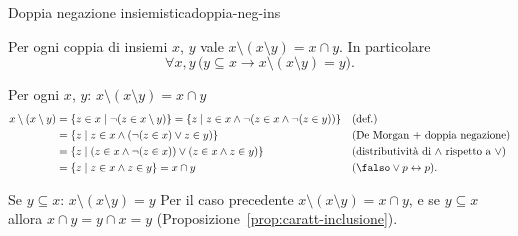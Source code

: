 \begin{concetto}
\begin{Proposizione}{Doppia negazione insiemistica}{doppia-neg-ins}
    \begin{prerequisiti}
    \end{prerequisiti}
    Per ogni coppia di insiemi $x$, $y$ vale $x \setminus (x \setminus y) = x \cap y$. In particolare
    \[ \forall x, y\,\big(y \subseteq x \rightarrow x \setminus (x \setminus y) = y\big). \]
\end{Proposizione}
\begin{dimostrazione}
    \begin{caso}{Per ogni $x$, $y$: $x \setminus (x \setminus y) = x \cap y$}
    \[
    \begin{aligned}
        x \setminus (x \setminus y) &= \{z \in x \mid \neg(z \in x \setminus y)\} = \{z \mid z \in x \wedge \neg(z \in x \wedge \neg(z \in y))\} && \text{(def.)}\\
        &= \{z \mid z \in x \wedge (\neg(z \in x) \vee z \in y)\} && \text{(De Morgan + doppia negazione)}\\
        &= \{z \mid (z \in x \wedge \neg(z \in x)) \vee (z \in x \wedge z \in y)\} && \text{(distributività di $\wedge$ rispetto a $\vee$)}\\
        &= \{z \mid z \in x \wedge z \in y\} = x \cap y && \text{($\falso \vee p \leftrightarrow p$)}.
    \end{aligned}
    \]
    \end{caso}
    \begin{caso}{Se $y \subseteq x$: $x \setminus (x \setminus y) = y$}
        Per il caso precedente $x \setminus (x \setminus y) = x \cap y$, e se $y \subseteq x$ allora
        $x \cap y = y \cap x = y$ (Proposizione~\ref{prop:caratt-inclusione}).
    \end{caso}
\end{dimostrazione}
\end{concetto}

